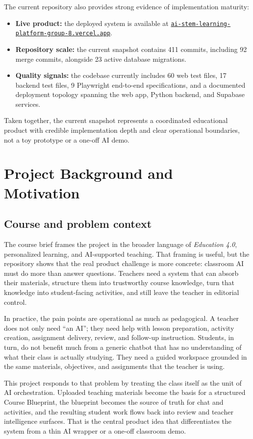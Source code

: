 \documentclass[11pt,a4paper]{article}
\newcommand{\LiveProductUrl}{\href{https://ai-stem-learning-platform-group-8.vercel.app/}{\nolinkurl{ai-stem-learning-platform-group-8.vercel.app}}}
\begin{document}
The current repository also provides strong evidence of implementation maturity:
\begin{itemize}
  \item \textbf{Live product:} the deployed system is available at \LiveProductUrl.
  \item \textbf{Repository scale:} the current snapshot contains 411 commits, including 92 merge
  commits, alongside 23 active database migrations.
  \item \textbf{Quality signals:} the codebase currently includes 60 web test files, 17 backend
  test files, 9 Playwright end-to-end specifications, and a documented deployment topology spanning
  the web app, Python backend, and Supabase services.
\end{itemize}

Taken together, the current snapshot represents a coordinated educational product with credible
implementation depth and clear operational boundaries, not a toy prototype or a one-off AI demo.

\section{Project Background and Motivation}

\subsection{Course and problem context}

The course brief frames the project in the broader language of \emph{Education 4.0}, personalized
learning, and AI-supported teaching. That framing is useful, but the repository shows that the real
product challenge is more concrete: classroom AI must do more than answer questions. Teachers need a
system that can absorb their materials, structure them into trustworthy course knowledge, turn that
knowledge into student-facing activities, and still leave the teacher in editorial control.

In practice, the pain points are operational as much as pedagogical. A teacher does not only need
``an AI''; they need help with lesson preparation, activity creation, assignment delivery, review,
and follow-up instruction. Students, in turn, do not benefit much from a generic chatbot that has no
understanding of what their class is actually studying. They need a guided workspace grounded in the
same materials, objectives, and assignments that the teacher is using.

This project responds to that problem by treating the class itself as the unit of AI orchestration.
Uploaded teaching materials become the basis for a structured Course Blueprint, the blueprint becomes
the source of truth for chat and activities, and the resulting student work flows back into review
and teacher intelligence surfaces. That is the central product idea that differentiates the system
from a thin AI wrapper or a one-off classroom demo.
\end{document}
